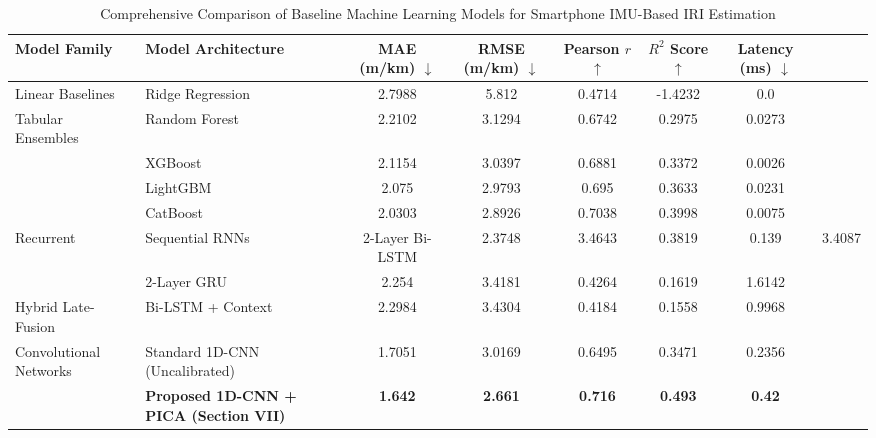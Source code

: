 \begin{table}[t]
\centering
\caption{Comprehensive Comparison of Baseline Machine Learning Models for Smartphone IMU-Based IRI Estimation}
\label{tab:baseline_comparison}
\begin{tabular}{llccccc}
\toprule
\textbf{Model Family} & \textbf{Model Architecture} & \textbf{MAE (m/km)} $\downarrow$ & \textbf{RMSE (m/km)} $\downarrow$ & \textbf{Pearson $r$} $\uparrow$ & \textbf{$R^2$ Score} $\uparrow$ & \textbf{Latency (ms)} $\downarrow$ \\
\midrule
Linear Baselines & Ridge Regression & 2.7988 & 5.812 & 0.4714 & -1.4232 & 0.0 \\
Tabular Ensembles & Random Forest & 2.2102 & 3.1294 & 0.6742 & 0.2975 & 0.0273 \\
 & XGBoost & 2.1154 & 3.0397 & 0.6881 & 0.3372 & 0.0026 \\
 & LightGBM & 2.075 & 2.9793 & 0.695 & 0.3633 & 0.0231 \\
 & CatBoost & 2.0303 & 2.8926 & 0.7038 & 0.3998 & 0.0075 \\
Recurrent & Sequential RNNs & 2-Layer Bi-LSTM & 2.3748 & 3.4643 & 0.3819 & 0.139 & 3.4087 \\
 & 2-Layer GRU & 2.254 & 3.4181 & 0.4264 & 0.1619 & 1.6142 \\
Hybrid Late-Fusion & Bi-LSTM + Context & 2.2984 & 3.4304 & 0.4184 & 0.1558 & 0.9968 \\
Convolutional Networks & Standard 1D-CNN (Uncalibrated) & 1.7051 & 3.0169 & 0.6495 & 0.3471 & 0.2356 \\
\midrule
\textbf{} & \textbf{Proposed 1D-CNN + PICA (Section VII)} & \textbf{1.642} & \textbf{2.661} & \textbf{0.716} & \textbf{0.493} & \textbf{0.42} \\
\bottomrule
\end{tabular}
\end{table}
